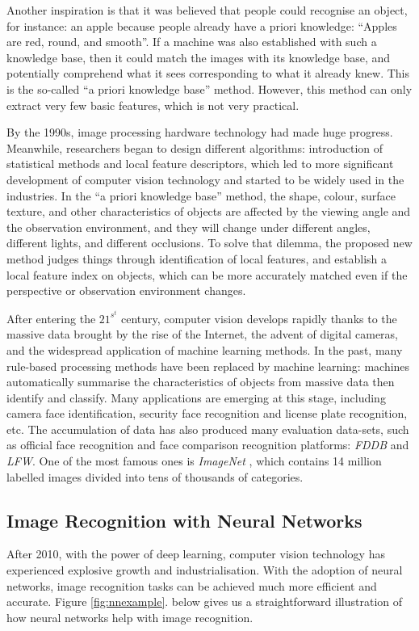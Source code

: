 Another inspiration is that it was believed that people could recognise an object, for instance: an apple because people already have a priori knowledge: ``Apples are red, round, and smooth''. If a machine was also established with such a knowledge base, then it could match the images with its knowledge base, and potentially comprehend what it sees corresponding to what it already knew. This is the so-called ``a priori knowledge base'' method. However, this method can only extract very few basic features, which is not very practical.

By the 1990s, image processing hardware technology had made huge progress. Meanwhile, researchers began to design different algorithms: introduction of statistical methods and local feature descriptors, which led to more significant development of computer vision technology and started to be widely used in the industries. In the ``a priori knowledge base'' method, the shape, colour, surface texture, and other characteristics of objects are affected by the viewing angle and the observation environment, and they will change under different angles, different lights, and different occlusions. To solve that dilemma, the proposed new method judges things through identification of local features, and establish a local feature index on objects, which can be more accurately matched even if the perspective or observation environment changes.

After entering the $21^s^t$ century, computer vision develops rapidly thanks to the massive data brought by the rise of the Internet, the advent of digital cameras, and the widespread application of machine learning methods. In the past, many rule-based processing methods have been replaced by machine learning: machines automatically summarise the characteristics of objects from massive data then identify and classify. Many applications are emerging at this stage, including camera face identification, security face recognition and license plate recognition, etc. The accumulation of data has also produced many evaluation data-sets, such as official face recognition and face comparison recognition platforms: \textit{FDDB} and \textit{LFW}. One of the most famous ones is \textit{ImageNet} \cite{imagenet}, which contains 14 million labelled images divided into tens of thousands of categories.


\subsection{Image Recognition with Neural Networks}
After 2010, with the power of deep learning, computer vision technology has experienced explosive growth and industrialisation. With the adoption of neural networks, image recognition tasks can be achieved much more efficient and accurate. Figure \ref{fig:nnexample}. below gives us a straightforward illustration of how neural networks help with image recognition.

